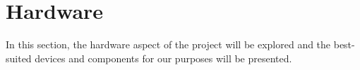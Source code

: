 \chapter{Hardware}\label{sec:hardware}
In this section, the hardware aspect of the project will be explored and the best-suited devices and components for our purposes will be presented.




